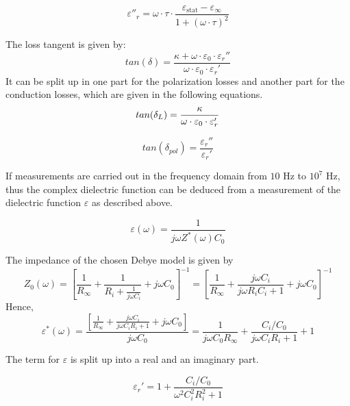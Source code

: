 \begin{equation}
\varepsilon''_r = \omega \cdot \tau \cdot \frac{\varepsilon_{\textrm{stat}}-\varepsilon_{\infty}}{1+(\omega \cdot \tau )^2}
\end{equation}

The loss tangent  is given by:
\begin{equation}
tan (\delta) = \frac{\kappa + \omega \cdot \varepsilon_0 \cdot \varepsilon _r ''}{\omega \cdot \varepsilon_0 \cdot \varepsilon _r '}
\end{equation}
It can be split up in one part for the polarization losses and another part for the conduction losses, which are given in the following equations. 
\begin{equation}
tan (\delta_{L}) = \frac{\kappa}{\omega \cdot \varepsilon_0 \cdot \varepsilon_r'} \newline
\end{equation}

\begin{equation}
tan (\delta_{pol}) = \frac {\varepsilon_r'' } {\varepsilon_r'}
\end{equation}


If measurements are carried out in the frequency domain from $10$ Hz to $10^{7}$ Hz, thus the complex dielectric function can be deduced from a measurement of the  dielectric function $\varepsilon$ as described above. 

\begin{equation}
\varepsilon(\omega) = \frac{1}{j \omega  Z^*(\omega) C_0}
\end{equation}

The impedance of the chosen Debye model is given by 
\begin{equation}
Z_0(\omega)=[\frac{1}{R_\infty}+\frac{1}{R_i+\frac{1}{j \omega C_i}}+j \omega C_0]^{-1} = [\frac{1}{R_\infty}+\frac{j \omega C_i}{j\omega R_i  C_i+1}+j \omega C_0]^{-1}
\end{equation}
Hence,
\begin{equation}
\varepsilon^*(\omega)= \frac{[\frac{1}{R_\infty}+\frac{j \omega C_i}{j\omega C_i R_i  +1}+j \omega C_0]}{j \omega C_0} = \frac{1}{j \omega C_0 R_\infty}+ \frac{C_i/C_0}{j\omega C_i R_i  +1}+1
\end{equation}

The term for $\varepsilon$ is split up into a real and an imaginary part. 

\begin{equation}
\varepsilon_r' = 1+ \frac{C_i/C_0}{\omega^2 C_i^2 R_i^2 +1}
\end{equation}

